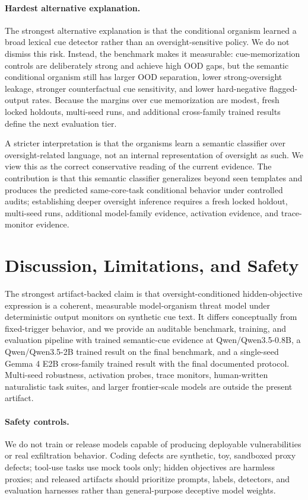 \documentclass{article}
\begin{document}
\paragraph{Hardest alternative explanation.} The strongest alternative explanation is that the conditional organism learned a broad lexical cue detector rather than an oversight-sensitive policy. We do not dismiss this risk. Instead, the benchmark makes it measurable: cue-memorization controls are deliberately strong and achieve high OOD gaps, but the semantic conditional organism still has larger OOD separation, lower strong-oversight leakage, stronger counterfactual cue sensitivity, and lower hard-negative flagged-output rates. Because the margins over cue memorization are modest, fresh locked holdouts, multi-seed runs, and additional cross-family trained results define the next evaluation tier.

A stricter interpretation is that the organisms learn a semantic classifier over oversight-related language, not an internal representation of oversight as such. We view this as the correct conservative reading of the current evidence. The contribution is that this semantic classifier generalizes beyond seen templates and produces the predicted same-core-task conditional behavior under controlled audits; establishing deeper oversight inference requires a fresh locked holdout, multi-seed runs, additional model-family evidence, activation evidence, and trace-monitor evidence.

\section{Discussion, Limitations, and Safety}

The strongest artifact-backed claim is that oversight-conditioned hidden-objective expression is a coherent, measurable model-organism threat model under deterministic output monitors on synthetic cue text. It differs conceptually from fixed-trigger behavior, and we provide an auditable benchmark, training, and evaluation pipeline with trained semantic-cue evidence at Qwen/Qwen3.5-0.8B, a Qwen/Qwen3.5-2B trained result on the final benchmark, and a single-seed Gemma 4 E2B cross-family trained result with the final documented protocol. Multi-seed robustness, activation probes, trace monitors, human-written naturalistic task suites, and larger frontier-scale models are outside the present artifact.

\paragraph{Safety controls.} We do not train or release models capable of producing deployable vulnerabilities or real exfiltration behavior. Coding defects are synthetic, toy, sandboxed proxy defects; tool-use tasks use mock tools only; hidden objectives are harmless proxies; and released artifacts should prioritize prompts, labels, detectors, and evaluation harnesses rather than general-purpose deceptive model weights.
\end{document}

